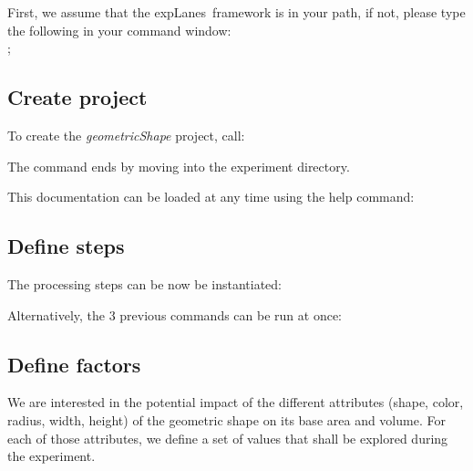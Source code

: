\documentclass[a4paper,fleqn]{tufte-handout}
\newcommand{\explanes}{\textsf{expLanes}\ }
\begin{document}
First, we assume that the \explanes framework is in your path, if not, please type the following in your command window: \\ ;

\subsection{Create project}

To create the \textsl{geometricShape} project, call:


The command ends by moving into the experiment directory.

This documentation can be loaded at any time using the help command:



\subsection{Define steps}

The processing steps can be now be instantiated:



\noindent
Alternatively, the  3 previous commands can be run at once: \\


\subsection{Define factors}

We are interested in the potential impact of the different attributes (shape, color, radius, width, height) of the geometric shape on its base area and volume. For each of those attributes, we define a set of values that shall be explored during the experiment.
\end{document}
